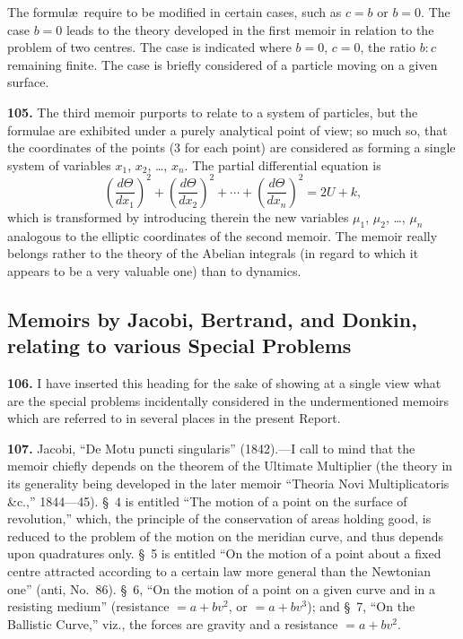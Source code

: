 \documentclass[11pt,a4paper]{article}
\theoremstyle{definition}
\begin{document}
The formul\ae\ require to be modified in certain cases, such as $c = b$ or $b = 0$. The case $b = 0$ leads to the theory developed in the first memoir in relation to the problem of two centres. The case is indicated where $b = 0$, $c = 0$, the ratio $b : c$ remaining finite. The case is briefly considered of a particle moving on a given surface.

\textbf{105.} The third memoir purports to relate to a system of particles, but the formulae are exhibited under a purely analytical point of view; so much so, that the coordinates of the points (3 for each point) are considered as forming a single system of variables $x_1$, $x_2$, \dots, $x_n$. The partial differential equation is
\[
\left(\frac{d\Theta}{dx_1}\right)^2 + \left(\frac{d\Theta}{dx_2}\right)^2 + \cdots + \left(\frac{d\Theta}{dx_n}\right)^2 = 2U + k,
\]
which is transformed by introducing therein the new variables $\mu_1$, $\mu_2$, \dots, $\mu_n$ analogous to the elliptic coordinates of the second memoir. The memoir really belongs rather to the theory of the Abelian integrals (in regard to which it appears to be a very valuable one) than to dynamics.


\subsection*{Memoirs by Jacobi, Bertrand, and Donkin, relating to various Special Problems}

\textbf{106.} I have inserted this heading for the sake of showing at a single view what are the special problems incidentally considered in the undermentioned memoirs which are referred to in several places in the present Report.

\textbf{107.} Jacobi, ``De Motu puncti singularis'' (1842).---I call to mind that the memoir chiefly depends on the theorem of the Ultimate Multiplier (the theory in its generality being developed in the later memoir ``Theoria Novi Multiplicatoris \&c.,'' 1844---45). \S~4 is entitled ``The motion of a point on the surface of revolution,'' which, the principle of the conservation of areas holding good, is reduced to the problem of the motion on the meridian curve, and thus depends upon quadratures only. \S~5 is entitled ``On the motion of a point about a fixed centre attracted according to a certain law more general than the Newtonian one'' (anti, No.~86). \S~6, ``On the motion of a point on a given curve and in a resisting medium'' (resistance $= a + bv^2$, or $= a + bv^3$); and \S~7, ``On the Ballistic Curve,'' viz., the forces are gravity and a resistance $= a + bv^2$.
\end{document}
